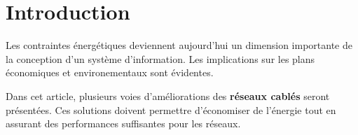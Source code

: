 \section*{Introduction}

Les contraintes énergétiques deviennent aujourd'hui un dimension importante de
la conception d'un système d'information.  Les implications sur les plans
économiques et environementaux sont évidentes.

Dans cet article, plusieurs voies d'améliorations des  \textbf{réseaux cablés}
seront présentées. Ces solutions doivent permettre d'économiser de l'énergie
tout en assurant des performances suffisantes pour les réseaux.
